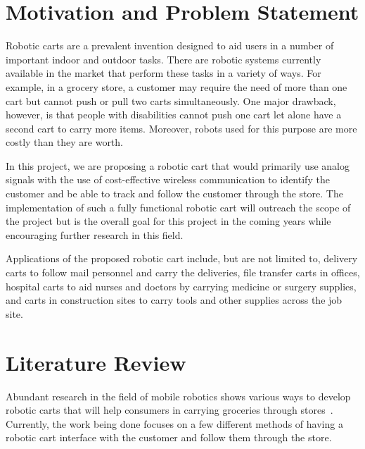 \section{Motivation and Problem Statement}
Robotic carts are a prevalent invention designed to aid users in a number of important indoor and outdoor tasks. There are robotic systems currently available in the market that perform these tasks in a variety of ways. For example, in a grocery store, a customer may require the need of more than one cart but cannot push or pull two carts simultaneously. One major drawback, however, is that people with disabilities cannot push one cart let alone have a second cart to carry more items. Moreover, robots used for this purpose are more costly than they are worth.

\vspace*{12pt}
\noindent
In this project, we are proposing a robotic cart that would primarily use analog signals with the use of cost-effective wireless communication to identify the customer and be able to track and follow the customer through the store. The implementation of such a fully functional robotic cart will outreach the scope of the project but is the overall goal for this project in the coming years while encouraging further research in this field.

\vspace*{12pt}
\noindent
Applications of the proposed robotic cart include, but are not limited to, delivery carts to follow mail personnel and carry the deliveries, file transfer carts in offices, hospital carts to aid nurses and doctors by carrying medicine or surgery supplies, and carts in construction sites to carry tools and other supplies across the job site.



\section{Literature Review}


Abundant research in the field of mobile robotics shows various ways to develop robotic carts that will help consumers in carrying groceries through stores~\cite{Rawashdeh2017-Person,islam_lam_fukuda_kobayashi_kuno_2019,Sales2016-CompaRob}. Currently, the work being done focuses on a few different methods of having a robotic cart interface with the customer and follow them through the store.


